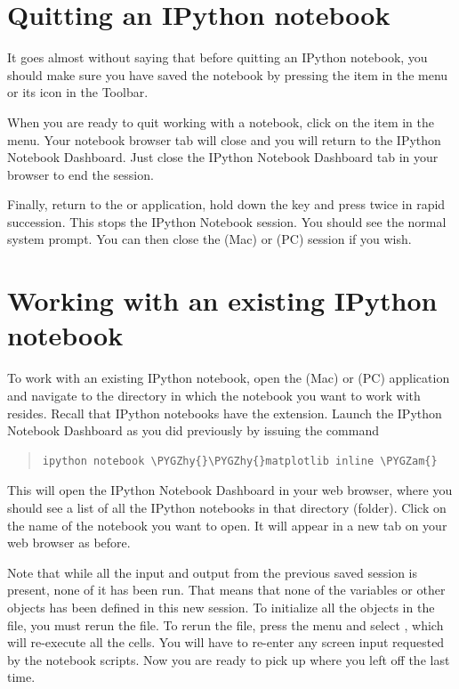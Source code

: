 \documentclass[letterpaper,10pt,english]{sphinxmanual}
\def\PYGZam{\char`\&}
\def\PYGZhy{\char`\-}
\begin{document}
\section{Quitting an IPython notebook}
\label{apdx2/apdx2_ipynb:quitting-an-ipython-notebook}
It goes almost without saying that before quitting an IPython notebook, you should make sure you have saved the notebook by pressing the  item in the  menu or its icon in the Toolbar.

When you are ready to quit working with a notebook, click on the  item in the  menu.  Your notebook browser tab will close and you will return to the IPython Notebook Dashboard.  Just close the IPython Notebook Dashboard tab in your browser to end the session.

Finally, return to the  or  application, hold down the  key and press  twice in rapid succession.  This stops the IPython Notebook session.  You should see the normal system prompt.  You can then close the  (Mac) or  (PC) session if you wish.


\section{Working with an existing IPython notebook}
\label{apdx2/apdx2_ipynb:working-with-an-existing-ipython-notebook}
To work with an existing IPython notebook, open the  (Mac) or  (PC) application and navigate to the directory in which the notebook you want to work with resides.  Recall that IPython notebooks have the  extension.  Launch the IPython Notebook Dashboard as you did previously by issuing the command
\begin{quote}

\begin{Verbatim}[commandchars=\\\{\}]
ipython notebook \PYGZhy{}\PYGZhy{}matplotlib inline \PYGZam{}
\end{Verbatim}
\end{quote}

This will open the IPython Notebook Dashboard in your web browser, where you should see a list of all the IPython notebooks in that directory (folder).  Click on the name of the notebook you want to open.  It will appear in a new tab on your web browser as before.

Note that while all the input and output from the previous saved session is present, none of it has been run.  That means that none of the variables or other objects has been defined in this new session.  To initialize all the objects in the file, you must rerun the file.  To rerun the file, press the  menu and select , which will re-execute all the cells.  You will have to re-enter any screen input requested by the notebook scripts.  Now you are ready to pick up where you left off the last time.
\label{apdx3/apdx3_resources::doc}
\end{document}
